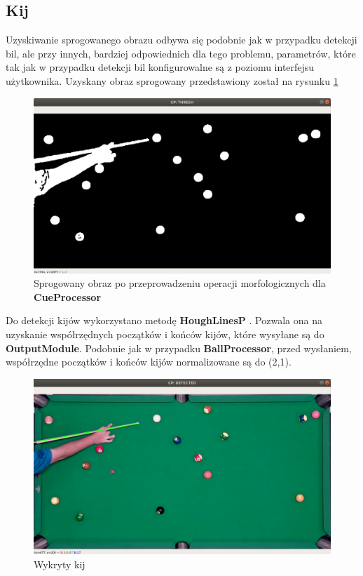 \documentclass[12pt]{article}
\begin{document}
\subsection{Kij}

Uzyskiwanie sprogowanego obrazu odbywa się podobnie jak w przypadku detekcji bil, ale przy innych, bardziej odpowiednich dla tego problemu, parametrów, które tak jak w przypadku detekcji bil konfigurowalne są z poziomu interfejsu użytkownika. Uzyskany obraz sprogowany przedstawiony został na rysunku \ref{cp_thresh}

\begin{figure}[!ht]
    \centering
    \includegraphics[width=15cm]{./images/obrazki/cp/cp_thresh.png}
    \caption{Sprogowany obraz po przeprowadzeniu operacji morfologicznych dla \textbf{CueProcessor}}
    \label{cp_thresh}
\end{figure}

\newpage

Do detekcji kijów wykorzystano metodę \textbf{HoughLinesP} \cite{HoughLinesP}. Pozwala ona na uzyskanie współrzędnych początków i końców kijów, które wysyłane są do \textbf{OutputModule}. Podobnie jak w przypadku \textbf{BallProcessor}, przed wysłaniem, współrzędne początków i końców kijów normalizowane są do (2,1).

\begin{figure}[!ht]
    \centering
    \includegraphics[width=15cm]{./images/obrazki/cp/cue_detected.png}
    \caption{Wykryty kij}
    \label{cue_detected}
\end{figure}
\end{document}

